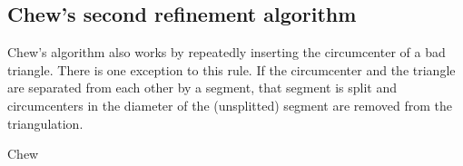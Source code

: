 \subsection{Chew's second refinement algorithm}
\label{sub:chews}

Chew's algorithm also works by repeatedly inserting the circumcenter of a bad triangle.
There is one exception to this rule.
If the circumcenter and the triangle are separated from each other by a segment, that segment is split and circumcenters in the diameter of the (unsplitted) segment are removed from the triangulation.
\cite{shewchuk}

\begin{algorithm}
    \caption{Chew}
    \begin{algorithmic}
                \Else
                \EndIf
            \EndWhile
        \EndFunction
    \end{algorithmic}
\end{algorithm}


